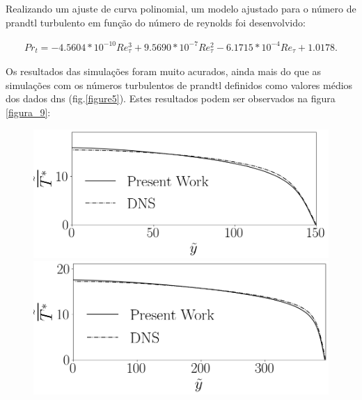 Realizando um ajuste de curva polinomial, um modelo ajustado para o número de prandtl turbulento em função do número de reynolds foi desenvolvido:

\begin{equation}
  \begin{split}
    Pr_t = -4.5604 * 10^{-10} Re_\tau^3 + 9.5690 * 10^{-7} Re_\tau^2 - 6.1715 *10 ^{-4} Re_\tau + 1.0178 .
  \end{split}
\end{equation}

Os resultados das simulações foram muito acurados, ainda mais do que as simulações com os números turbulentos de prandtl definidos como valores médios dos dados dns (fig.\ref{figure5}). Estes resultados podem ser observados na figura \ref{figura_9}:

\begin{figure}[!h]
	\centering
	\begin{minipage}[t]{0.5\textwidth}
		\centering
		\includegraphics[angle=0, scale=0.34]{fotos_formatacao_final/Temperature_150_071_Prt(Ret)_A26}
	\end{minipage}
	\begin{minipage}[t]{0.45\textwidth}
		\centering
		\includegraphics[angle=0, scale=0.34]{fotos_formatacao_final/Temperature_395_071_Prt(Ret)_A26}

\end{minipage}
\end{figure}

